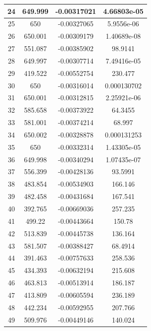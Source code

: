\begin{table}[h]
{\begin{tabular}{|c|c|c|c|}
24   &   649.999   &   -0.00317021   &   4.66803e-05  \\  \hline  
25   &   650   &   -0.00327065   &   5.9556e-06  \\  \hline  
26   &   650.001   &   -0.00309179   &   1.40689e-08  \\  \hline  
27   &   551.087   &   -0.00385902   &   98.9141  \\  \hline  
28   &   649.997   &   -0.00307714   &   7.49416e-05  \\  \hline  
29   &   419.522   &   -0.00552754   &   230.477  \\  \hline  
30   &   650   &   -0.00316014   &   0.000130702  \\  \hline  
31   &   650.001   &   -0.00312815   &   2.25921e-06  \\  \hline  
32   &   585.658   &   -0.00373922   &   64.3455  \\  \hline  
33   &   581.001   &   -0.00374214   &   68.997  \\  \hline  
34   &   650.002   &   -0.00328878   &   0.000131253  \\  \hline  
35   &   650   &   -0.00332314   &   1.43305e-05  \\  \hline  
36   &   649.998   &   -0.00340294   &   1.07435e-07  \\  \hline  
37   &   556.399   &   -0.00428136   &   93.5991  \\  \hline  
38   &   483.854   &   -0.00534903   &   166.146  \\  \hline  
39   &   482.458   &   -0.00431684   &   167.541  \\  \hline  
40   &   392.765   &   -0.00669036   &   257.235  \\  \hline  
41   &   499.22   &   -0.00443664   &   150.78  \\  \hline  
42   &   513.839   &   -0.00445738   &   136.164  \\  \hline  
43   &   581.507   &   -0.00388427   &   68.4914  \\  \hline  
44   &   391.463   &   -0.00757633   &   258.536  \\  \hline  
45   &   434.393   &   -0.00632194   &   215.608  \\  \hline  
46   &   463.813   &   -0.00513914   &   186.187  \\  \hline  
47   &   413.809   &   -0.00605594   &   236.189  \\  \hline  
48   &   442.234   &   -0.00592955   &   207.766  \\  \hline  
49   &   509.976   &   -0.00449146   &   140.024  \\  \hline  

\end{tabular}}
\end{table}
